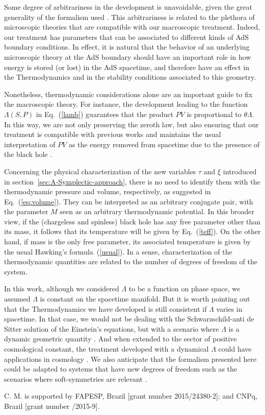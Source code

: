 \documentclass[prd,onecolumn,notitlepage,amsmath,nofootinbib,superscriptaddress,showpacs,showkeys]{revtex4-1}
\begin{document}
Some degree of arbitrariness in the development is unavoidable, given
the great generality of the formalism used \cite{baldfresmol2016}.
This arbitrariness is related to the plethora of microscopic theories
that are compatible with our macroscopic treatment. Indeed, our treatment
has parameters that can be associated to different kinds of AdS boundary
conditions. In effect, it is natural that the behavior of an underlying
microscopic theory at the AdS boundary should have an important role
in how energy is stored (or lost) in the AdS spacetime, and therefore
have an effect in the Thermodynamics and in the stability conditions
associated to this geometry.

Nonetheless, thermodynamic considerations alone are an important guide
to fix the macroscopic theory. For instance, 
the development leading to the function $\Lambda(S,P)$ in Eq.~(\ref{lamb})
guarantees that the product $PV$ is proportional to $\theta \Lambda$. In this way, we are not only preserving the zeroth law, but also ensuring that our treatment is compatible with previous works and maintains the usual interpretation of $PV$ as the energy removed from spacetime due to the presence of the black hole \cite{Joh14}.


Concerning the physical characterization of the new variables $\tau$ 
and $\xi$ introduced in section~\ref{sec:A-Symplectic-approach}, 
there is no need to identify them with the thermodynamic pressure and 
volume, respectively, as suggested in Eq.~(\ref{eq:volume}). 
They can be interpreted as an arbitrary conjugate pair, with the parameter $M$ 
seen as an arbitrary thermodynamic potential. 
In this broader view, if the (chargeless and spinless) black hole has any free parameter other than its mass, it follows that its temperature will be given by Eq.~(\ref{teff}). On the other hand, if mass is the only free parameter, its associated temperature is given by the usual Hawking's formula~(\ref{usual}). 
In a sense, characterization of the thermodynamic quantities are related to the number of degrees of freedom of the system.

In this work, although we considered $\Lambda$ to be a function on
phase space, we assumed $\Lambda$ is constant on the spacetime manifold.
But it is worth pointing out that the Thermodynamics
we have developed is still consistent if $\Lambda$ varies in spacetime.
In that case, we would not be dealing with the Schwarzschild-anti
de Sitter solution of the Einstein's equations, but with a scenario
where $\Lambda$ is a dynamic geometric quantity \cite{kastor2009}.
And when extended to the sector of positive cosmological constant,
the treatment developed with a dynamical $\Lambda$ could have applications
in cosmology \cite{Lima}. We also anticipate that the formalism
presented here could be adapted to systems that have new degrees of
freedom such as the scenarios where soft-symmetries are relevant \cite{Haw2016}.




\begin{acknowledgments}

C. M. is supported by FAPESP, Brazil [grant number 2015/24380-2]; and CNPq,
Brazil [grant number /2015-9].

\end{acknowledgments}



\bigskip{}
\end{document}
